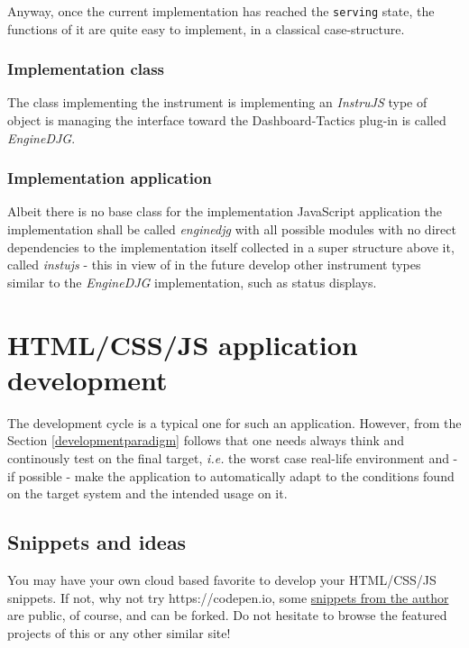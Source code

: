 \documentclass[11pt]{article}
\begin{document}
    Anyway, once the current implementation has reached the \texttt{serving}
state, the functions of it are quite easy to implement, in a classical
case-structure.

    \hypertarget{implementation-class}{%
\subsubsection{Implementation class}\label{implementation-class}}

    The class implementing the instrument is implementing an \emph{InstruJS}
type of object is managing the interface toward the Dashboard-Tactics
plug-in is called \emph{EngineDJG}.

    \hypertarget{implementation-application}{%
\subsubsection{Implementation
application}\label{implementation-application}}

    Albeit there is no base class for the implementation JavaScript
application the implementation shall be called \emph{enginedjg} with all
possible modules with no direct dependencies to the implementation
itself collected in a super structure above it, called \emph{instujs} -
this in view of in the future develop other instrument types similar to
the \emph{EngineDJG} implementation, such as status displays.

    \hypertarget{htmlcssjs-application-development}{%
\section{HTML/CSS/JS application
development}\label{htmlcssjs-application-development}}

    The development cycle is a typical one for such an application. However,
from the Section \ref{developmentparadigm} follows that one needs always
think and continously test on the final target, \emph{i.e.} the worst
case real-life environment and - if possible - make the application to
automatically adapt to the conditions found on the target system and the
intended usage on it.

    \hypertarget{snippets-and-ideas}{%
\subsection{Snippets and ideas}\label{snippets-and-ideas}}

    You may have your own cloud based favorite to develop your HTML/CSS/JS
snippets. If not, why not try https://codepen.io, some
\href{https://codepen.io/petrim}{snippets from the author} are public,
of course, and can be forked. Do not hesitate to browse the featured
projects of this or any other similar site!
\end{document}
